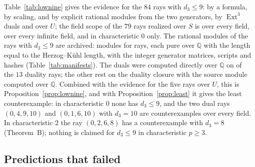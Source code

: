 \documentclass[11pt]{article}
\theoremstyle{definition}
\theoremstyle{remark}
\newcommand{\Q}{\mathbb{Q}}
\newcommand{\Ext}{\operatorname{Ext}}
\begin{document}
Table~\ref{tab:lownine} gives the evidence for the $84$ rays with $d_3\le9$: \nlowNineFormula{} by a formula, \nlowNineScaling{} by scaling, \nlowNineSocle{} and \nlowNineModule{} by explicit rational modules from the two generators, \nlowNineDual{} by $\Ext^3$ duals and \nlowNineExcluded{} over $U$; the field scope of the $79$ rays realized over $S$ is \nlowNineAny{} over every field, \nlowNineInfinite{} over every infinite field, and \nlowNineZero{} in characteristic $0$ only. The rational modules of the rays with $d_3\le9$ are archived: \nqqModules{} modules for \nqqRays{} rays, each pure over $\Q$ with the length equal to the Herzog--K\"uhl length, with the integer generator matrices, scripts and hashes (Table~\ref{tab:manifests}). The duals were computed directly over $\Q$ on \nqqDualsDirect{} of the $13$ duality rays; the other \nqqDualsClosure{} rest on the duality closure with the source module computed over $\Q$. Combined with the evidence for the five rays over $U$, this is Proposition~\ref{prop:lownine}, and with Proposition~\ref{prop:least} it gives the least counterexample: in characteristic $0$ none has $d_3\le9$, and the two dual rays $(0,4,9,10)$ and $(0,1,6,10)$ with $d_3=10$ are counterexamples over every field. In characteristic $2$ the ray $(0,2,6,8)$ has a counterexample with $d_3=8$ (Theorem~B); nothing is claimed for $d_3\le9$ in characteristic $p\ge3$.

\begin{table}[htbp]
\centering\footnotesize

\caption{Evidence for the primitive point on each of the $84$ rays with $d_3\le9$, with the number of rays of each type and its field scope; the rays realized by formulas carry the field of the weakest construction they need, and the explicit modules are archived over $\Q$ with their integer matrices.}
\label{tab:lownine}
\end{table}

\subsection{Predictions that failed}
\label{sec:predfail}
\end{document}
